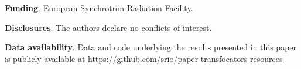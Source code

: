 \documentclass[9pt,twocolumn,twoside]{osajnl}
\begin{document}
\textbf{Funding}. European Synchrotron Radiation Facility.


\textbf{Disclosures}. The authors declare no conflicts of interest.

\textbf{Data availability}. Data and code underlying the results presented in this paper is publicly available at \url{https://github.com/srio/paper-transfocators-resources}








\end{document}

